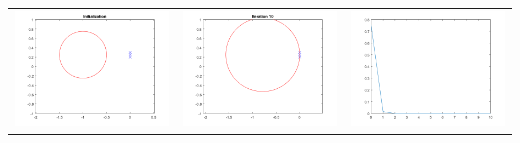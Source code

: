 \documentclass[12pt]{article}
\begin{document}
\begin{enumerate}
\begin{center}
\begin{tabular}{|c|c|c|}
				\includegraphics[scale = 0.3]{x0_1_start.png}
				&
				\includegraphics[scale = 0.3]{x0_1_end.png}
				&
				\includegraphics[scale = 0.3]{x0_1_error.png} \\

\end{tabular}
\end{center}
\end{enumerate}
\end{document}
